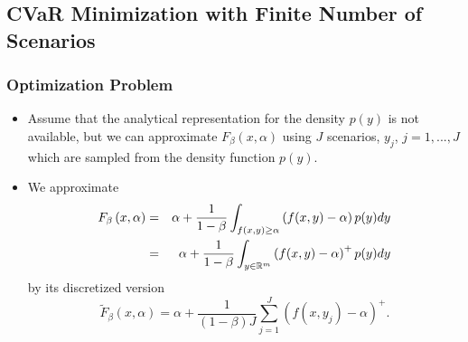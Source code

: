 \documentclass[pdf,10pt,xcolor=dvipsnames,hide notes]{beamer}
\begin{document}
\subsection{CVaR Minimization with Finite Number of Scenarios}
\begin{frame}[label=frame2b7]
	\frametitle{Optimization Problem}
	
		\begin{itemize}
		\justifying
		
		\item Assume that the analytical representation for the density $p(y)$ is not
		available, but we can approximate $F_{\beta }\left( x,\alpha \right) $ using
		$J$ scenarios, $y_{j}$, $j=1,...,J$ which are sampled from the density
		function $p(y)$. 
		
		\vspace{0.3cm}
		
		\item We approximate
		\begin{eqnarray}
		F_{\beta }\left( x,\alpha \right) &=&\alpha +\frac{1}{1-\beta }%
		\int_{f(x,y)\geq \alpha }\left( f(x,y)-\alpha \right) p(y)dy  \notag \\
		&=&\alpha +\frac{1}{1-\beta }\int_{y\in
			\mathbb{R}
			^{m}}\left( f(x,y)-\alpha \right) ^{+}p(y)dy  \label{fb}
		\end{eqnarray}%
		by its discretized version
		\begin{equation*}
		\widetilde{F}_{\beta }\left( x,\alpha \right) =\alpha +\frac{1}{\left(
			1-\beta \right) J}\sum_{j=1}^{J}\left( f(x,y_{j})-\alpha \right) ^{+}.
		\end{equation*}%
				
	\end{itemize}
	
\end{frame}
\end{document}
